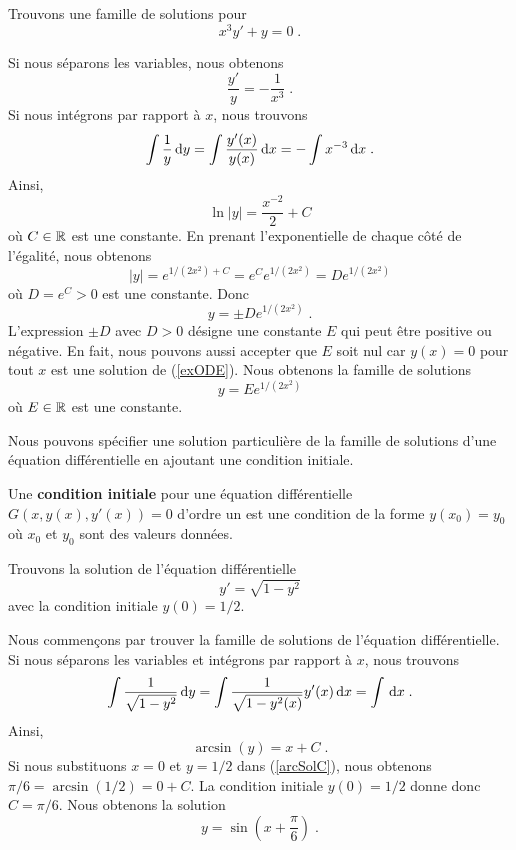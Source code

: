 {\begin{egg}
Trouvons une famille de solutions pour
\begin{equation}\label{exODE}
x^3 y' + y = 0 \; .
\end{equation}

Si nous séparons les variables, nous obtenons
\[
\frac{y'}{y} = -\frac{1}{x^3} \; .
\]
Si nous intégrons par rapport à $x$, nous trouvons
\[
\int \frac{1}{y} \,\mathrm{d}y = \int \frac{y'(x)}{y(x)} \,\mathrm{d}x
= - \int x^{-3} \,\mathrm{d}x \; .
\]
Ainsi,
\[
\ln|y| = \frac{x^{-2}}{2} + C
\]
où $C \in \mathbb{R}$ est une constante.  En prenant l'exponentielle de
chaque côté de l'égalité, nous obtenons
\[
|y| = e^{1/(2x^2) + C} = e^C e^{1/(2x^2)} = D e^{1/(2x^2)}
\]
où $D=e^C > 0$ est une constante.  Donc
\[
y = \pm D e^{1/(2x^2)} \; .
\]
L'expression $\pm D$ avec $D>0$ désigne une constante $E$ qui peut
être positive ou négative.  En fait, nous pouvons aussi accepter que $E$
soit nul car $y(x) = 0$ pour tout $x$ est une solution de
(\ref{exODE}).  Nous obtenons la famille de solutions
\[
y = E e^{1/(2x^2)}
\]
où $E\in \mathbb{R}$ est une constante.
\end{egg}

Nous pouvons spécifier une solution particulière de la famille de solutions
d'une équation différentielle en ajoutant une condition initiale.

\begin{defn} 
Une {\bfseries condition initiale} pour une équation différentielle
$G(x,y(x),y'(x))=0$ d'ordre un est une condition de la forme
$y(x_0)=y_0$ où $x_0$ et $y_0$ sont des valeurs données.
\end{defn}

\begin{egg}
Trouvons la solution de l'équation différentielle
\[
y'= \sqrt{1-y^2}
\]
avec la condition initiale $y(0) = 1/2$.

Nous commençons par trouver la famille de solutions de l'équation
différentielle. Si nous séparons les variables et intégrons par rapport à
$x$, nous trouvons
\[
\int \frac{1}{\sqrt{1-y^2}} \,\mathrm{d}y
= \int \frac{1}{\sqrt{1-y^2(x)}} y'(x) \,\mathrm{d}x = \int \,\mathrm{d}x \; .
\]
Ainsi,
\begin{equation}\label{arcSolC}
\arcsin(y) = x + C \; .
\end{equation}
Si nous substituons $x=0$ et $y=1/2$ dans (\ref{arcSolC}), nous obtenons
$\pi/6 = \arcsin(1/2) = 0 + C$.  La condition initiale $y(0)= 1/2$
donne donc $C=\pi/6$.  Nous obtenons la solution
\[
y = \sin\left(x+\frac{\pi}{6}\right) \; .
\]
\end{egg}

}
